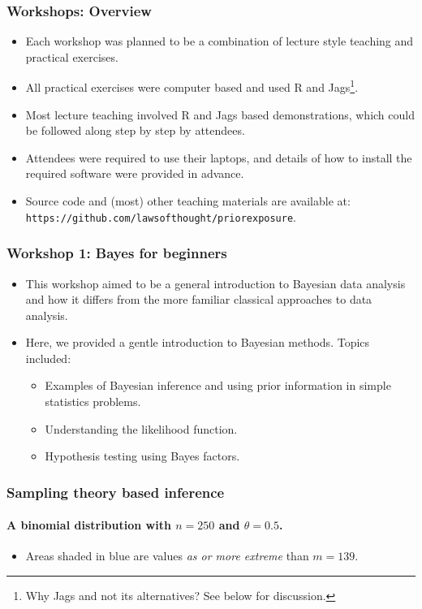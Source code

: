\begin{frame}
	\frametitle{Workshops: Overview}

	\begin{itemize}
		\item Each workshop was planned to be a combination of lecture style teaching and practical exercises.
		\item All practical exercises were computer based and used R and Jags\footnote{Why Jags and not its alternatives? See below for discussion.}.
		\item Most lecture teaching involved R and Jags based demonstrations, which could be followed along step by step by attendees.
		\item Attendees were required to use their laptops, and details of how to install the required software were provided in advance.
		\item Source code and (most) other teaching materials are available at: \texttt{https://github.com/lawsofthought/priorexposure}.
	\end{itemize}

\end{frame}

\begin{frame}
	\frametitle{Workshop 1: Bayes for beginners}

	\begin{itemize}
		\item This workshop aimed to be a general introduction to Bayesian data analysis and how it differs from the more familiar classical approaches to data analysis.
		\item Here, we provided a gentle introduction to Bayesian methods. Topics included:
			\begin{itemize}
				\item Examples of Bayesian inference and using prior information in simple statistics problems.
				\item Understanding the likelihood function.
				\item Hypothesis testing using Bayes factors.
			\end{itemize}
	\end{itemize}

\end{frame}

\begin{frame}
	\frametitle{Sampling theory based inference}
	\framesubtitle{A binomial distribution with $n=250$ and $\theta=0.5$.}
	
	{\small
	\begin{itemize}
	\item Areas shaded in blue are values \emph{as or more extreme} than $m=139$.
	\end{itemize}
	}
\end{frame}

